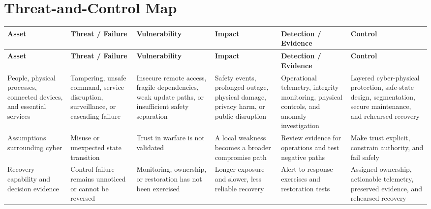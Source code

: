 \documentclass[11pt,letterpaper]{article}
\begin{document}
\section*{Threat-and-Control Map}
\begingroup\scriptsize\setlength{\tabcolsep}{2pt}
\begin{longtable}{>{\raggedright\arraybackslash}p{}>{\raggedright\arraybackslash}p{}>{\raggedright\arraybackslash}p{}>{\raggedright\arraybackslash}p{}>{\raggedright\arraybackslash}p{}>{\raggedright\arraybackslash}p{}}
\toprule\rowcolor{Navy}\color{white}\textbf{Asset} & \color{white}\textbf{Threat / Failure} & \color{white}\textbf{Vulnerability} & \color{white}\textbf{Impact} & \color{white}\textbf{Detection / Evidence} & \color{white}\textbf{Control}\\\midrule
\endfirsthead
\toprule\rowcolor{Navy}\color{white}\textbf{Asset} & \color{white}\textbf{Threat / Failure} & \color{white}\textbf{Vulnerability} & \color{white}\textbf{Impact} & \color{white}\textbf{Detection / Evidence} & \color{white}\textbf{Control}\\\midrule
\endhead
People, physical processes, connected devices, and essential services & Tampering, unsafe command, service disruption, surveillance, or cascading failure & Insecure remote access, fragile dependencies, weak update paths, or insufficient safety separation & Safety events, prolonged outage, physical damage, privacy harm, or public disruption & Operational telemetry, integrity monitoring, physical controls, and anomaly investigation & Layered cyber-physical protection, safe-state design, segmentation, secure maintenance, and rehearsed recovery\\\midrule
Assumptions surrounding cyber & Misuse or unexpected state transition & Trust in warfare is not validated & A local weakness becomes a broader compromise path & Review evidence for operations and test negative paths & Make trust explicit, constrain authority, and fail safely\\\midrule
Recovery capability and decision evidence & Control failure remains unnoticed or cannot be reversed & Monitoring, ownership, or restoration has not been exercised & Longer exposure and slower, less reliable recovery & Alert-to-response exercises and restoration tests & Assigned ownership, actionable telemetry, preserved evidence, and rehearsed recovery\\\midrule
\bottomrule
\end{longtable}
\endgroup
\end{document}
